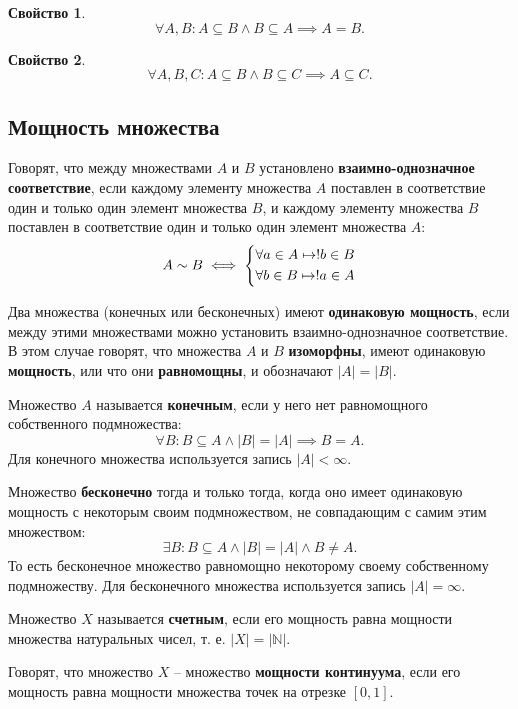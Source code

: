 \documentclass[a5paper, 11pt]{extarticle}
\theoremstyle{definition}
\newtheorem{property}{Свойство}[subsection]
\theoremstyle{definition}
\theoremstyle{definition}
\numberwithin{figure}{section}
\numberwithin{table}{section}
\begin{document}
\begin{property}
    \[
        \forall A, B : A \subseteq B \land B \subseteq A \implies A = B.
    \]
\end{property}

\begin{property}
    \[
        \forall A, B, C : A \subseteq B \land B \subseteq C \implies A \subseteq C.
    \]
\end{property}

\subsection{Мощность множества}

Говорят, что между множествами \(A\) и \(B\) установлено \textbf{взаимно-однозначное соответствие}, если каждому элементу множества \(A\) поставлен в соответствие один и только один элемент множества \(B\), и каждому элементу множества \(B\) поставлен в соответствие один и только один элемент множества \(A\):
\[
    A \sim B
    \iff
    \begin{dcases}
        \forall a \in A \mapsto !b \in B \\
        \forall b \in B \mapsto !a \in A
    \end{dcases}
\]

Два множества (конечных или бесконечных) имеют \textbf{одинаковую мощность}, если между этими множествами можно установить взаимно-однозначное соответствие. В этом случае говорят, что множества \(A\) и \(B\) \textbf{изоморфны}, имеют одинаковую \textbf{мощность}, или что они \textbf{равномощны}, и обозначают \(|A| = |B|\).

Множество \(A\) называется \textbf{конечным}, если у него нет равномощного собственного подмножества:
\[
    \forall B: B \subseteq A \land |B| = |A| \implies B = A.
\]
Для конечного множества используется запись \(|A| < \infty\).

Множество \textbf{бесконечно} тогда и только тогда, когда оно имеет одинаковую мощность с некоторым своим подмножеством, не совпадающим с самим этим множеством:
\[
    \exists B: B \subseteq A \land |B| = |A| \land B \neq A.
\]
То есть бесконечное множество равномощно некоторому своему собственному подмножеству. Для бесконечного множества используется запись \(|A| = \infty\).

Множество \(X\) называется \textbf{счетным}, если его мощность равна мощности множества натуральных чисел, т. е. \(|X| = |\mathbb{N}|\).

Говорят, что множество \(X\) -- множество \textbf{мощности континуума}, если его мощность равна мощности множества точек на отрезке \([0, 1]\).
\end{document}
